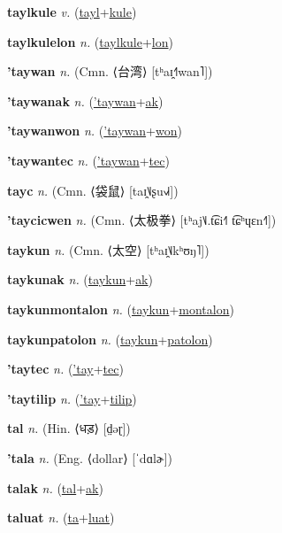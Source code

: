 \textbf{\hypertarget{taylkule}{taylkule}} \textit{v.} (\hyperlink{tayl}{tayl}+\allowbreak \hyperlink{kule}{kule})


\textbf{\hypertarget{taylkulelon}{taylkulelon}} \textit{n.} (\hyperlink{taylkule}{taylkule}+\allowbreak \hyperlink{lon}{lon})


\textbf{\hypertarget{'taywan}{'taywan}} \textit{n.} (Cmn. ⟨{\chinese{}台湾}⟩ [tʰaɪ̯˧˥wan˥])


\textbf{\hypertarget{'taywanak}{'taywanak}} \textit{n.} (\hyperlink{'taywan}{'taywan}+\allowbreak \hyperlink{ak}{ak})


\textbf{\hypertarget{'taywanwon}{'taywanwon}} \textit{n.} (\hyperlink{'taywan}{'taywan}+\allowbreak \hyperlink{won}{won})


\textbf{\hypertarget{'taywantec}{'taywantec}} \textit{n.} (\hyperlink{'taywan}{'taywan}+\allowbreak \hyperlink{tec}{tec})


\textbf{\hypertarget{tayc}{tayc}} \textit{n.} (Cmn. ⟨{\chinese{}袋鼠}⟩ [taɪ̯˥˩ʂu˧˩˧])


\textbf{\hypertarget{'taycicwen}{'taycicwen}} \textit{n.} (Cmn. ⟨{\chinese{}太极拳}⟩ [tʰaj˥˩.t͡ɕi˧˥ t͡ɕʰɥɛn˧˥])


\textbf{\hypertarget{taykun}{taykun}} \textit{n.} (Cmn. ⟨{\chinese{}太空}⟩ [tʰaɪ̯˥˩kʰʊŋ˥])


\textbf{\hypertarget{taykunak}{taykunak}} \textit{n.} (\hyperlink{taykun}{taykun}+\allowbreak \hyperlink{ak}{ak})


\textbf{\hypertarget{taykunmontalon}{taykunmontalon}} \textit{n.} (\hyperlink{taykun}{taykun}+\allowbreak \hyperlink{montalon}{montalon})


\textbf{\hypertarget{taykunpatolon}{taykunpatolon}} \textit{n.} (\hyperlink{taykun}{taykun}+\allowbreak \hyperlink{patolon}{patolon})


\textbf{\hypertarget{'taytec}{'taytec}} \textit{n.} (\hyperlink{'tay}{'tay}+\allowbreak \hyperlink{tec}{tec})


\textbf{\hypertarget{'taytilip}{'taytilip}} \textit{n.} (\hyperlink{'tay}{'tay}+\allowbreak \hyperlink{tilip}{tilip})


\textbf{\hypertarget{tal}{tal}} \textit{n.} (Hin. ⟨{\devanagari{}धड़}⟩ [d̤əɽ])


\textbf{\hypertarget{'tala}{'tala}} \textit{n.} (Eng. ⟨dollar⟩ [ˈdɑlɚ])


\textbf{\hypertarget{talak}{talak}} \textit{n.} (\hyperlink{tal}{tal}+\allowbreak \hyperlink{ak}{ak})


\textbf{\hypertarget{taluat}{taluat}} \textit{n.} (\hyperlink{ta}{ta}+\allowbreak \hyperlink{luat}{luat})


